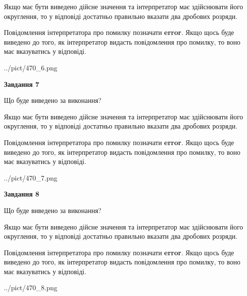 \documentclass[12pt, ukrainian]{article}
\begin{document}
{\begin {Large}
Якщо має бути виведено дійсне значення та інтерпретатор має здійснювати його округлення, 
то у відповіді достатньо правильно вказати два дробових розряди.

Повідомлення інтерпретатора про помилку позначати \textbf{error}.
Якщо щось буде виведено до того, як інтерпретатор видасть повідомлення про помилку, 
то воно має вказуватись у відповіді. \par

\begin{center}
	{../pict/470_6.png}
\end{center}
\newpage

{\begin {center}\textbf{Завдання 7}\end {center}}\par
Що буде виведено за виконання? \par

Якщо має бути виведено дійсне значення та інтерпретатор має здійснювати його округлення, 
то у відповіді достатньо правильно вказати два дробових розряди.

Повідомлення інтерпретатора про помилку позначати \textbf{error}.
Якщо щось буде виведено до того, як інтерпретатор видасть повідомлення про помилку, 
то воно має вказуватись у відповіді. \par

\begin{center}
	{../pict/470_7.png}
\end{center}
\newpage

{\begin {center}\textbf{Завдання 8}\end {center}}\par
Що буде виведено за виконання? \par

Якщо має бути виведено дійсне значення та інтерпретатор має здійснювати його округлення, 
то у відповіді достатньо правильно вказати два дробових розряди.

Повідомлення інтерпретатора про помилку позначати \textbf{error}.
Якщо щось буде виведено до того, як інтерпретатор видасть повідомлення про помилку, 
то воно має вказуватись у відповіді. \par

\begin{center}
	{../pict/470_8.png}
\end{center}
\newpage


\end{Large}}
\end{document}
